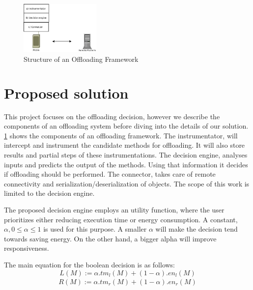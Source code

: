 \documentclass[10pt, conference, letterpaper]{IEEEtran}
\begin{document}
\begin{figure}[!t]
  \centering
  \includegraphics[width=0.35\textwidth]{imgs/system.jpeg}
  \caption{Structure of an Offloading Framework}
  \label{fig:systemDiagram}
\end{figure}

  \section{Proposed solution} \label{sec:design}

  This project focuses on the offloading decision, however we describe the components of an offloading system before diving into the details of our solution. \ref{fig:systemDiagram} shows the components of an offloading framework. The instrumentator, will intercept and instrument the candidate methods for offloading. It will also store results and partial steps of these instrumentations. The decision engine, analyses inputs and predicts the output of the methods. Using that information it decides if offloading should be performed. The connector, takes care of remote connectivity and serialization/deserialization of objects.  The scope of this work is limited to the decision engine.

  The proposed decision engine employs an utility function, where the user prioritizes either reducing execution time or energy consumption. A constant, $\alpha, 0 \leq \alpha \leq 1$ is used for this purpose. A smaller $\alpha$ will make the decision tend towards saving energy. On the other hand, a bigger alpha will improve responsiveness. 

  The main equation for the boolean decision is as follows:
  \begin{equation} \label{eq:localutility}
    L(M) := \alpha . tm_{l}(M) + (1-\alpha) . en_{l}(M) 
  \end{equation}
  \begin{equation} \label{eq:remoteutility}
  \begin{multlined}
    R(M) := \alpha . tm_{r}(M) + (1-\alpha) . en_{r}(M) 
  \end{multlined}
  \end{equation}
\end{document}

